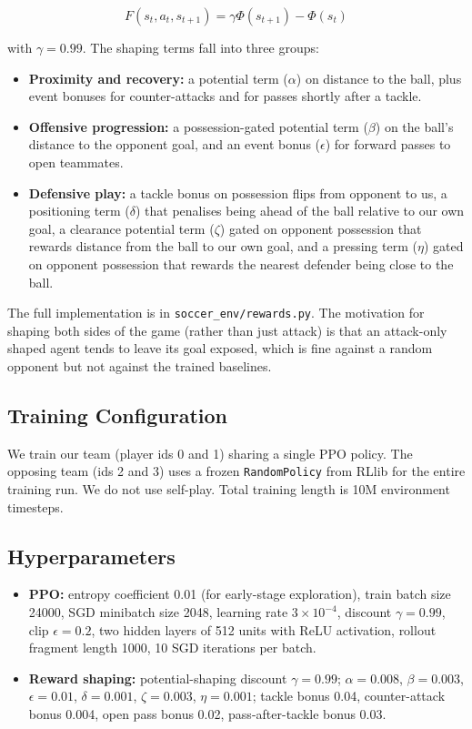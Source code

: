 \documentclass{article}
\begin{document}
$$F(s_t, a_t, s_{t+1}) = \gamma \Phi(s_{t+1}) - \Phi(s_t)$$

with $\gamma = 0.99$. The shaping terms fall into three groups:

\begin{itemize}
    \item \textbf{Proximity and recovery:} a potential term ($\alpha$) on distance to the ball, plus event bonuses for counter-attacks and for passes shortly after a tackle.
    \item \textbf{Offensive progression:} a possession-gated potential term ($\beta$) on the ball's distance to the opponent goal, and an event bonus ($\epsilon$) for forward passes to open teammates.
    \item \textbf{Defensive play:} a tackle bonus on possession flips from opponent to us, a positioning term ($\delta$) that penalises being ahead of the ball relative to our own goal, a clearance potential term ($\zeta$) gated on opponent possession that rewards distance from the ball to our own goal, and a pressing term ($\eta$) gated on opponent possession that rewards the nearest defender being close to the ball.
\end{itemize}

The full implementation is in \texttt{soccer\_env/rewards.py}. The motivation for shaping both sides of the game (rather than just attack) is that an attack-only shaped agent tends to leave its goal exposed, which is fine against a random opponent but not against the trained baselines.

\subsection{Training Configuration}

We train our team (player ids 0 and 1) sharing a single PPO policy. The opposing team (ids 2 and 3) uses a frozen \texttt{RandomPolicy} from RLlib for the entire training run. We do not use self-play. Total training length is 10M environment timesteps.

\subsection{Hyperparameters}

\begin{itemize}
    \item \textbf{PPO:} entropy coefficient 0.01 (for early-stage exploration), train batch size 24000, SGD minibatch size 2048, learning rate $3 \times 10^{-4}$, discount $\gamma = 0.99$, clip $\epsilon = 0.2$, two hidden layers of 512 units with ReLU activation, rollout fragment length 1000, 10 SGD iterations per batch.
    \item \textbf{Reward shaping:} potential-shaping discount $\gamma = 0.99$; $\alpha = 0.008$, $\beta = 0.003$, $\epsilon = 0.01$, $\delta = 0.001$, $\zeta = 0.003$, $\eta = 0.001$; tackle bonus 0.04, counter-attack bonus 0.004, open pass bonus 0.02, pass-after-tackle bonus 0.03.
\end{itemize}
\end{document}
